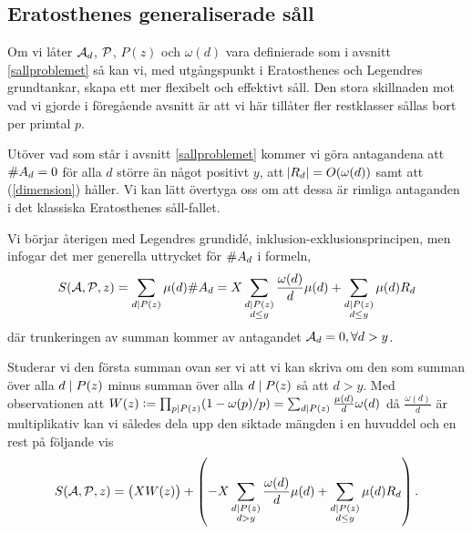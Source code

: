 \subsection{Eratosthenes generaliserade såll}
Om vi låter $\A_d$, $\P$, $P(z)$ och $\omega(d)$ vara definierade som i avsnitt \ref{sallproblemet} så kan vi, med utgångspunkt i Eratosthenes och Legendres grundtankar, skapa ett mer flexibelt och effektivt såll. Den stora skillnaden mot vad vi gjorde i föregående avsnitt är att vi här tillåter fler restklasser sållas bort per primtal $p$. 

Utöver vad som står i avsnitt \ref{sallproblemet} kommer vi göra antagandena att \(\card{A_d} = 0\) för alla \(d\) större än något positivt $y$, att $\abs{R_d} = O(\omega(d))$ samt att (\ref{dimension}) håller. Vi kan lätt övertyga oss om att dessa är rimliga antaganden i det klassiska Eratosthenes såll-fallet. 

Vi börjar återigen med Legendres grundidé, inklusion-exklusionsprincipen, men infogar det mer generella uttrycket för $\card{A_d}$ i formeln,
\begin{align*}
    \S{A}{P}{z} = \sum_{d \divides P(z)} \mu(d) \card{A_d} = X \sum_{\substack{d \divides P(z) \\ d \leq y}} \frac{\omega(d)}{d} \mu(d) + \sum_{\substack{d \divides P(z)  \\ d \leq y}} \mu(d) R_d 
\end{align*}
där trunkeringen av summan kommer av antagandet \(\A_d = 0, \forall d > y\). 

Studerar vi den första summan ovan ser vi att vi kan skriva om den som summan över alla \(d \divides P(z)\) minus summan över alla \(d \divides P(z)\) så att \(d > y\).
Med observationen att \(W(z) := \prod_{p \divides P(z)} (1 - \omega(p)/p) = \sum_{d \divides P(z)} \frac{\mu(d)}{d} \omega(d)\) då \(\frac{\omega(d)}{d}\) är multiplikativ kan vi således dela upp den siktade mängden i en huvuddel och en rest på följande vis
\begin{align*}
    \S{A}{P}{z} = \left(X W(z) \right) + \left(- X \sum_{\substack{d \divides P(z) \\ d > y}} \frac{\omega(d)}{d} \mu(d) + \sum_{\substack{d \divides P(z)  \\ d \leq y}} \mu(d) R_d \right).
\end{align*} %

